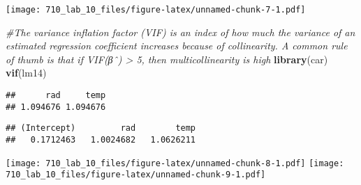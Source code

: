 \documentclass[]{article}
\newenvironment{Shaded}{\begin{snugshade}}{\end{snugshade}}
\newcommand{\KeywordTok}[1]{\textcolor[rgb]{0.13,0.29,0.53}{\textbf{#1}}}
\newcommand{\CommentTok}[1]{\textcolor[rgb]{0.56,0.35,0.01}{\textit{#1}}}
\newcommand{\NormalTok}[1]{#1}
\begin{document}
\texttt{[image: 710\_lab\_10\_files/figure-latex/unnamed-chunk-7-1.pdf]}

\begin{Shaded}
\begin{Highlighting}[]
 \CommentTok{#The variance inflation factor (VIF) is an index of how much the variance of an estimated regression coefficient increases because of collinearity. A common rule of thumb is that if VIF(βˆ) > 5, then multicollinearity is high}
\KeywordTok{library}\NormalTok{(car)}
\KeywordTok{vif}\NormalTok{(lm14)}
\end{Highlighting}
\end{Shaded}

\begin{verbatim}
##      rad     temp 
## 1.094676 1.094676
\end{verbatim}

\begin{verbatim}
## (Intercept)         rad        temp 
##   0.1712463   1.0024682   1.0626211
\end{verbatim}

\texttt{[image: 710\_lab\_10\_files/figure-latex/unnamed-chunk-8-1.pdf]}
\texttt{[image: 710\_lab\_10\_files/figure-latex/unnamed-chunk-9-1.pdf]}
\end{document}
